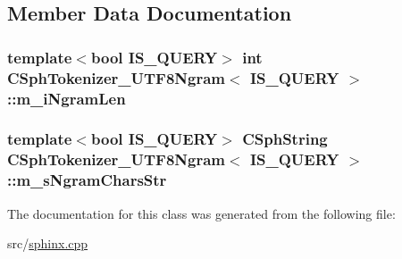 \subsection{Member Data Documentation}
\hypertarget{classCSphTokenizer__UTF8Ngram_a5d0666a1a962ab48b7f76d18fb17438a}{
\subsubsection[{m\-\_\-i\-Ngram\-Len}]{\setlength{\rightskip}{0pt plus 5cm}template$<$bool I\-S\-\_\-\-Q\-U\-E\-R\-Y$>$ {\bf int} {\bf C\-Sph\-Tokenizer\-\_\-\-U\-T\-F8\-Ngram}$<$ I\-S\-\_\-\-Q\-U\-E\-R\-Y $>$\-::m\-\_\-i\-Ngram\-Len\hspace{0.3cm}{\ttfamily [protected]}}}\label{classCSphTokenizer__UTF8Ngram_a5d0666a1a962ab48b7f76d18fb17438a}
\hypertarget{classCSphTokenizer__UTF8Ngram_ae3ab8a685fcabe6f52e3413054cc493f}{
\subsubsection[{m\-\_\-s\-Ngram\-Chars\-Str}]{\setlength{\rightskip}{0pt plus 5cm}template$<$bool I\-S\-\_\-\-Q\-U\-E\-R\-Y$>$ {\bf C\-Sph\-String} {\bf C\-Sph\-Tokenizer\-\_\-\-U\-T\-F8\-Ngram}$<$ I\-S\-\_\-\-Q\-U\-E\-R\-Y $>$\-::m\-\_\-s\-Ngram\-Chars\-Str\hspace{0.3cm}{\ttfamily [protected]}}}\label{classCSphTokenizer__UTF8Ngram_ae3ab8a685fcabe6f52e3413054cc493f}


The documentation for this class was generated from the following file\-:\begin{DoxyCompactItemize}
\item 
src/\hyperlink{sphinx_8cpp}{sphinx.\-cpp}\end{DoxyCompactItemize}
